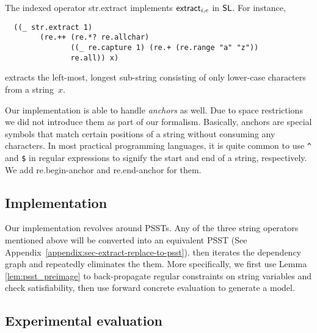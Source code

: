 The indexed operator {\sf str.extract} implements $\mathsf{extract}_{i, e}$ in
$\mathsf{SL}$. For instance,
%
\begin{verbatim}
  ((_ str.extract 1)
        (re.++ (re.*? re.allchar)
               ((_ re.capture 1) (re.+ (re.range "a" "z"))
               re.all)) x)
\end{verbatim}
%
extracts the left-most, longest sub-string consisting of only lower-case
characters from a string~$x$.

Our implementation is able to handle \textit{anchors} as well. Due to space restrictions we did not introduce them as part of our formalism. Basically, anchors are special symbols that match certain positions of a string without consuming any characters. In most practical programming languages, it is quite common to use \verb!^! and \verb!$! in regular expressions to signify the start and end of a string, respectively. We add \textsf{re.begin-anchor} and \textsf{re.end-anchor} for them.

\subsection{Implementation}

Our implementation revolves around PSSTs. Any of the three string operators mentioned above will be converted into an equivalent PSST (See Appendix~\ref{appendix:sec-extract-replace-to-psst}). {\ostrich} then iterates the dependency graph and repeatedly eliminates the them. More specifically, we first use Lemma \ref{lem:psst_preimage} to back-propagate regular constraints on string variables and check satisfiability, then use forward concrete evaluation to generate a model. 

\subsection{Experimental evaluation}

